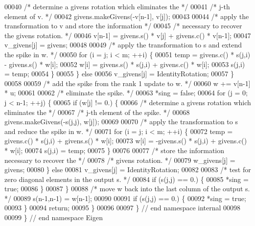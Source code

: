 \begin{DoxyCode}
00040             \textcolor{comment}{/* determine a givens rotation which eliminates the */}
00041             \textcolor{comment}{/* j-th element of v. */}
00042             givens.makeGivens(-v[n-1], v[j]);
00043 
00044             \textcolor{comment}{/* apply the transformation to v and store the information */}
00045             \textcolor{comment}{/* necessary to recover the givens rotation. */}
00046             v[n-1] = givens.s() * v[j] + givens.c() * v[n-1];
00047             v\_givens[j] = givens;
00048 
00049             \textcolor{comment}{/* apply the transformation to s and extend the spike in w. */}
00050             \textcolor{keywordflow}{for} (i = j; i < m; ++i) \{
00051                 temp = givens.c() * s(j,i) - givens.s() * w[i];
00052                 w[i] = givens.s() * s(j,i) + givens.c() * w[i];
00053                 s(j,i) = temp;
00054             \}
00055         \} \textcolor{keywordflow}{else}
00056             v\_givens[j] = IdentityRotation;
00057     \}
00058 
00059     \textcolor{comment}{/* add the spike from the rank 1 update to w. */}
00060     w += v[n-1] * u;
00061 
00062     \textcolor{comment}{/* eliminate the spike. */}
00063     *sing = \textcolor{keyword}{false};
00064     \textcolor{keywordflow}{for} (j = 0; j < n-1; ++j) \{
00065         \textcolor{keywordflow}{if} (w[j] != 0.) \{
00066             \textcolor{comment}{/* determine a givens rotation which eliminates the */}
00067             \textcolor{comment}{/* j-th element of the spike. */}
00068             givens.makeGivens(-s(j,j), w[j]);
00069 
00070             \textcolor{comment}{/* apply the transformation to s and reduce the spike in w. */}
00071             \textcolor{keywordflow}{for} (i = j; i < m; ++i) \{
00072                 temp = givens.c() * s(j,i) + givens.s() * w[i];
00073                 w[i] = -givens.s() * s(j,i) + givens.c() * w[i];
00074                 s(j,i) = temp;
00075             \}
00076 
00077             \textcolor{comment}{/* store the information necessary to recover the */}
00078             \textcolor{comment}{/* givens rotation. */}
00079             w\_givens[j] = givens;
00080         \} \textcolor{keywordflow}{else}
00081             v\_givens[j] = IdentityRotation;
00082 
00083         \textcolor{comment}{/* test for zero diagonal elements in the output s. */}
00084         \textcolor{keywordflow}{if} (s(j,j) == 0.) \{
00085             *sing = \textcolor{keyword}{true};
00086         \}
00087     \}
00088     \textcolor{comment}{/* move w back into the last column of the output s. */}
00089     s(n-1,n-1) = w[n-1];
00090 
00091     \textcolor{keywordflow}{if} (s(j,j) == 0.) \{
00092         *sing = \textcolor{keyword}{true};
00093     \}
00094     \textcolor{keywordflow}{return};
00095 \}
00096 
00097 \} \textcolor{comment}{// end namespace internal}
00098 
00099 \} \textcolor{comment}{// end namespace Eigen}
\end{DoxyCode}
